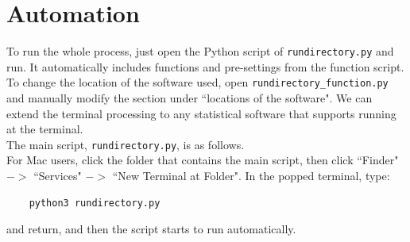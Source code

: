 \documentclass[12pt, a4paper]{article}
\begin{document}
\section{Automation}

To run the whole process, just open the Python script of \texttt{rundirectory.py} and run. It automatically includes functions and pre-settings from the function script.\\

To change the location of the software used, open \texttt{rundirectory\_function.py} and manually modify the section under ``locations of the software". We can extend the terminal processing to any statistical software that supports running at the terminal.\\

The main script, \texttt{rundirectory.py}, is as follows.\\



For Mac users, click the folder that contains the main script, then click ``Finder" $->$ ``Services" $->$ ``New Terminal at Folder". In the popped terminal, type:
\begin{verbatim}
	python3 rundirectory.py
\end{verbatim}
and return, and then the script starts to run automatically.\\

\nocite{*}
\printbibliography
\end{document}
